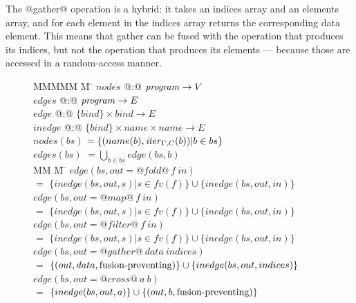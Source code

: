 The @gather@ operation is a hybrid: it takes an indices array and an elements array, and for each element in the indices array returns the corresponding data element. This means that gather can be fused with the operation that produces its indices, but not the operation that produces its elements --- because those are accessed in a random-access manner. 


\begin{figure}
\begin{tabbing}
MMMMM       \= M  \= \kill
$nodes$     \> @:@ \> $\mathit{program} \to V$                          \\
$edges$     \> @:@ \> $\mathit{program} \to E$                          \\
$edge$      \> @:@ \> $\{bind\} \times bind \to E$              \\
$inedge$    \> @:@ \> $\{bind\} \times name \times name \to E$
\\[1ex]
$nodes(bs)$ \> $= \{(name(b), \mathit{iter}_{\Gamma,C}(b)) | b \in bs\}$
\\[1ex]
$edges(bs)$ \> $= \bigcup_{b \in bs}edge(bs, b)$
\\[1ex]
MM             \= M \= \kill
$edge(bs, out = @fold@~f~in)$ \\
    \> $=$    \> $\{inedge(bs,out,s) | s \in fv(f)\} \cup \{inedge(bs, out, in) \}$
\\
$edge(bs, out = @map@~f~in)$  \\
    \> $=$    \> $\{inedge(bs,out,s) | s \in fv(f)\} \cup \{inedge(bs, out, in) \}$
\\
$edge(bs, out = @filter@~f~in)$ \\
    \> $=$    \> $\{inedge(bs,out,s) | s \in fv(f)\} \cup \{inedge(bs, out, in) \}$
\\
$edge(bs, out = @gather@~data~indices)$ \\
    \> $=$    \> $\{(out,data, \mbox{fusion-preventing}) \} \cup \{inedge(bs, out, indices) \}$      
\\
$edge(bs, out = @cross@~a~b)$ \\
    \> $=$    \> $\{inedge(bs, out, a) \}           \cup      \{(out, b, \mbox{fusion-preventing}) \}$
\\

\end{tabbing}
\end{figure}
